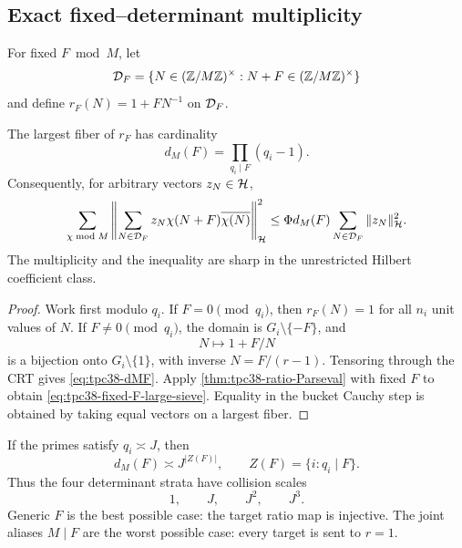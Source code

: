 \subsection{Exact fixed--determinant multiplicity}

For fixed \(F\bmod M\), let
\begin{equation}
 \mathcal D_F=\{N\in(\mathbb Z/M\mathbb Z)^\times:N+F\in(\mathbb Z/M\mathbb Z)^\times\}
 \label{eq:tpc38-DF}
\end{equation}
and define \(r_F(N)=1+FN^{-1}\) on \(\mathcal D_F\).

\begin{theorem}
\label{thm:tpc38-fixed-F-collision}
The largest fiber of \(r_F\) has cardinality
\begin{equation}
 \boxed{d_M(F)=\prod_{q_i\mid F}(q_i-1).}
 \label{eq:tpc38-dMF}
\end{equation}
Consequently, for arbitrary vectors \(z_N\in\mathcal H\),
\begin{equation}
 \sum_{\chi\bmod M}
 \left\|\sum_{N\in\mathcal D_F}z_N
 \chi(N+F)\overline{\chi(N)}\right\|_{\mathcal H}^2
 \le\Phi d_M(F)\sum_{N\in\mathcal D_F}\|z_N\|_{\mathcal H}^2.
 \label{eq:tpc38-fixed-F-large-sieve}
\end{equation}
The multiplicity and the inequality are sharp in the unrestricted Hilbert
coefficient class.
\end{theorem}

\begin{proof}
Work first modulo \(q_i\).  If \(F=0\pmod{q_i}\), then \(r_F(N)=1\) for
all \(n_i\) unit values of \(N\).  If \(F\ne0\pmod{q_i}\), the domain is
\(G_i\setminus\{-F\}\), and
\[
 N\longmapsto 1+F/N
\]
is a bijection onto \(G_i\setminus\{1\}\), with inverse
\(N=F/(r-1)\).  Tensoring through the CRT gives
\eqref{eq:tpc38-dMF}.  Apply
\cref{thm:tpc38-ratio-Parseval} with fixed \(F\) to obtain
\eqref{eq:tpc38-fixed-F-large-sieve}.  Equality in the bucket Cauchy step
is obtained by taking equal vectors on a largest fiber.
\end{proof}

If the primes satisfy \(q_i\asymp J\), then
\begin{equation}
 d_M(F)\asymp J^{|Z(F)|},
 \qquad
 Z(F)=\{i:q_i\mid F\}.
 \label{eq:tpc38-collision-strata}
\end{equation}
Thus the four determinant strata have collision scales
\begin{equation}
 1,\qquad J,\qquad J^2,\qquad J^3.
 \label{eq:tpc38-collision-scales}
\end{equation}
Generic \(F\) is the best possible case: the target ratio map is injective.
The joint aliases \(M\mid F\) are the worst possible case: every target is
sent to \(r=1\).

